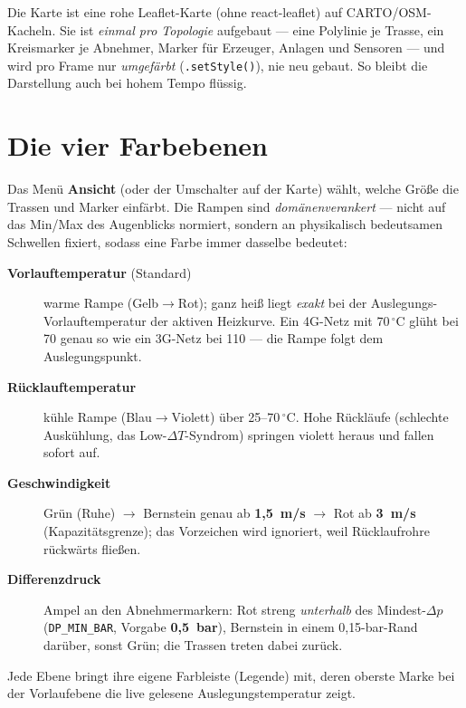 \documentclass[11pt,a4paper,parskip=half]{scrreprt}
\newcommand{\ui}[1]{\textsf{\bfseries #1}}
\newcommand{\gC}{\,\ensuremath{{}^{\circ}\mathrm{C}}}
\begin{document}
Die Karte ist eine rohe Leaflet-Karte (ohne react-leaflet) auf
CARTO/OSM-Kacheln. Sie ist \emph{einmal pro Topologie} aufgebaut --- eine
Polylinie je Trasse, ein Kreismarker je Abnehmer, Marker für Erzeuger, Anlagen
und Sensoren --- und wird pro Frame nur \emph{umgefärbt}
(\texttt{.setStyle()}), nie neu gebaut. So bleibt die Darstellung auch bei
hohem Tempo flüssig.

\section{Die vier Farbebenen}
\label{sec:ebenen}

Das Menü \ui{Ansicht} (oder der Umschalter auf der Karte) wählt, welche Größe
die Trassen und Marker einfärbt. Die Rampen sind \emph{domänenverankert} ---
nicht auf das Min/Max des Augenblicks normiert, sondern an physikalisch
bedeutsamen Schwellen fixiert, sodass eine Farbe immer dasselbe bedeutet:

\begin{description}
  \item[\ui{Vorlauftemperatur} (Standard)] warme Rampe (Gelb$\rightarrow$Rot);
    \glqq ganz heiß\grqq{} liegt \emph{exakt} bei der Auslegungs-Vorlauftemperatur
    der aktiven Heizkurve. Ein 4G-Netz mit 70\gC{} glüht bei 70 genau so wie
    ein 3G-Netz bei 110 --- die Rampe folgt dem Auslegungspunkt.
  \item[\ui{Rücklauftemperatur}] kühle Rampe (Blau$\rightarrow$Violett) über
    25--70\gC. Hohe Rückläufe (schlechte Auskühlung, das
    \glqq Low-$\Delta T$-Syndrom\grqq) springen violett heraus und fallen
    sofort auf.
  \item[\ui{Geschwindigkeit}] Grün (Ruhe) $\rightarrow$ Bernstein genau ab
    \textbf{1{,}5~m/s} $\rightarrow$ Rot ab \textbf{3~m/s} (Kapazitätsgrenze);
    das Vorzeichen wird ignoriert, weil Rücklaufrohre \glqq rückwärts\grqq{}
    fließen.
  \item[\ui{Differenzdruck}] Ampel an den Abnehmermarkern: Rot streng
    \emph{unterhalb} des Mindest-$\Delta p$ (\texttt{DP\_MIN\_BAR}, Vorgabe
    \textbf{0{,}5~bar}), Bernstein in einem 0{,}15-bar-Rand darüber, sonst Grün;
    die Trassen treten dabei zurück.
\end{description}


Jede Ebene bringt ihre eigene Farbleiste (Legende) mit, deren oberste Marke bei
der Vorlaufebene die live gelesene Auslegungstemperatur zeigt.
\end{document}
